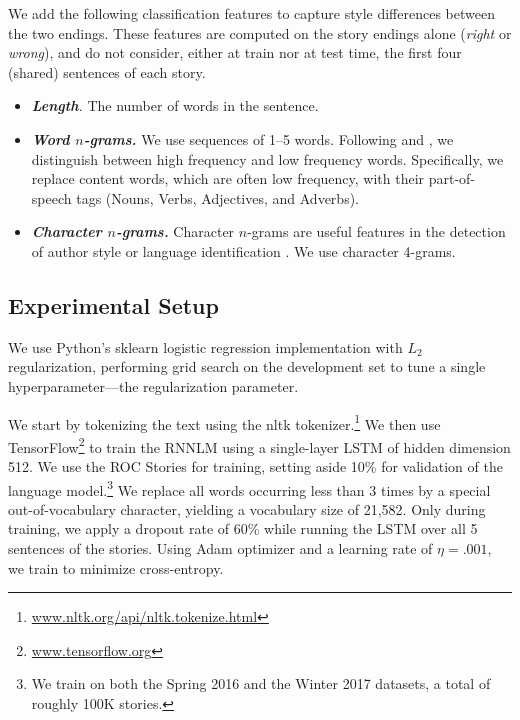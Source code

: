 \documentclass[11pt]{article}
\begin{document}
We add the following classification features to capture style differences between the two endings. 
These features are computed on the story endings alone ({\it right} or {\it wrong}), and do not consider, either at train nor at test time, the first four (shared) sentences of each story.
\begin{itemize}
\item\textit{\textbf{Length}.} The number of words in the sentence.
\item\textit{\textbf{Word $n$-grams.}} We use sequences of 1--5
  words. Following  and , we distinguish between high frequency and low frequency words. 
Specifically, we replace content words, which are often low frequency, with their part-of-speech tags (Nouns, Verbs, Adjectives, and Adverbs).
\item\textit{\textbf{Character $n$-grams.}} Character $n$-grams are useful features in the detection of author style \cite{Stamatatos:2009} or language identification \cite{lui2011cross}.
We use character 4-grams.
\end{itemize}



\subsection{Experimental Setup}
We use  Python's sklearn logistic regression implementation with $L_2$
regularization, performing grid search on the development set to
tune a single hyperparameter---the regularization parameter.  

We start by tokenizing the text using the nltk tokenizer.\footnote{\url{www.nltk.org/api/nltk.tokenize.html}} 
We then use TensorFlow\footnote{\url{www.tensorflow.org}} to train the RNNLM using a single-layer LSTM of hidden dimension 512.
We use the ROC Stories for training, setting aside 10\% for validation of the language model.\footnote{We train on both the Spring 2016 and the Winter 2017 datasets, a total of roughly 100K stories.}
We replace all words occurring less than 3 times by a special out-of-vocabulary character, yielding a vocabulary size of 21,582.
Only during training, we apply a dropout rate of 60\% while running the LSTM over all 5 sentences of the stories. 
Using Adam optimizer \cite{kingma2014adam} and a learning rate of
$\eta=.001$, we train to minimize cross-entropy.
\end{document}
